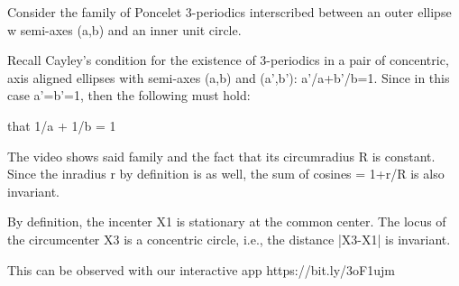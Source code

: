 Consider the family of Poncelet 3-periodics interscribed between an outer ellipse w semi-axes (a,b) and an inner unit circle.

Recall Cayley's condition for the existence of 3-periodics in a pair of concentric, axis aligned ellipses with semi-axes (a,b) and (a',b'): a'/a+b'/b=1. Since in this case a'=b'=1, then the following must hold:

 that 1/a + 1/b = 1

The video shows said family and the fact that its circumradius R is constant. Since the inradius r by definition is as well, the sum of cosines = 1+r/R is also invariant.

By definition, the incenter X1 is stationary at the common center. The locus of the circumcenter X3 is a concentric circle, i.e., the distance |X3-X1| is invariant.

This can be observed with our interactive app https://bit.ly/3oF1ujm